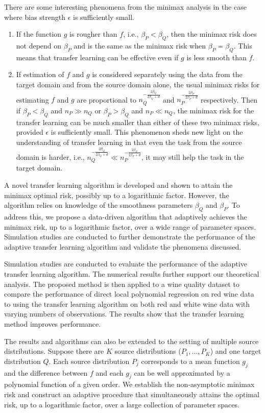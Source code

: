 \documentclass{article}
\begin{document}
There are some interesting phenomena from the minimax analysis in the case where  bias strength $\epsilon$ is sufficiently small. 
\begin{enumerate}
    \item If the function $g$ is rougher than $f$, i.e., $\beta_P < \beta_Q$,  then the minimax risk does not depend on $\beta_P$ and is the same as the minimax risk when $\beta_P=\beta_Q$. This means that transfer learning can be effective even if $g$ is less smooth than $f$.
    \item If estimation of $f$ and $g$ is considered separately using the data from the target domain and from the source domain alone, the usual minimax risks for estimating $f$ and $g$ are proportional to $n_Q^{-\frac{2\beta_Q}{2\beta_Q+d}}$ and  $n_P^{-\frac{2\beta_P}{2\beta_P+d}}$ respectively. Then if $\beta_P < \beta_Q$ and $n_P\gg n_Q$ or $\beta_P > \beta_Q$ and $n_P\ll n_Q$, the minimax risk for the transfer learning can be much smaller than either of these two minimax risks, provided $\epsilon$ is sufficiently small. This phenomenon sheds new light on the understanding of transfer learning in that even the task from the source domain is harder, i.e., $n_Q^{-\frac{2\beta_Q}{2\beta_Q+d}}\ll n_P^{-\frac{2\beta_P}{2\beta_P+d}}$, it may still help the task in the target domain. 
\end{enumerate}
A novel transfer learning algorithm is developed and shown to attain the minimax optimal risk, possibly up to a logarithmic factor. 
However, the algorithm relies on knowledge of the smoothness parameters $\beta_Q$ and $\beta_P$. To address this, we propose a data-driven algorithm that adaptively achieves the minimax risk, up to a logarithmic factor, over a wide range of parameter spaces. Simulation studies are conducted to further demonstrate the performance of the adaptive transfer learning algorithm and validate the phenomena discussed.

Simulation studies are conducted to evaluate the performance of the adaptive transfer learning algorithm. The numerical results  further support our theoretical analysis. The proposed method is then applied to a wine quality dataset \citep{cortez2009modeling} to compare the performance of direct local polynomial regression on red wine data to using the transfer learning algorithm on both red and white wine data with varying numbers of observations. The results show that the transfer learning method improves performance.

The results and algorithms can also be extended to the setting of multiple source distributions. Suppose there are $K$ source distributions ($P_1, \dots, P_K$) and one target distribution $Q$. Each source distribution $P_j$ corresponds to a mean function $g_j$ and the difference between $f$ and each $g_j$ can be well approximated by a polynomial function of a given order. We establish the non-asymptotic minimax risk and construct an adaptive procedure that simultaneously attains the optimal risk, up to a logarithmic factor, over a large collection of parameter spaces.
\end{document}
